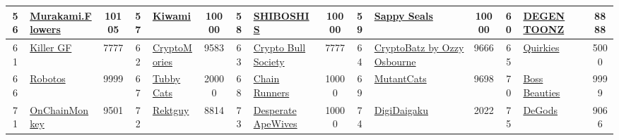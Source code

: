 \begin{table*}[]
{\begin{tabular}{|c|l|c|c|l|c|c|l|c|c|l|c|c|l|c|}
        56    & \href{https://murakamiflowers.kaikaikiki.com/}{Murakami.Flowers}                   & 10105             & 57    & \href{https://kiwami.app/}{Kiwami}                                                                & 10000             & 58    & \href{https://shiboshis.shibaswap.com/\#/}{SHIBOSHIS}                             & 10000             & 59    & \href{https://sappyseals.io}{Sappy Seals}                                     & 10000             & 60    & \href{https://degentoonz.io}{DEGEN TOONZ}                                                 & 8888                                    \\ \hline
        61    & \href{https://killergf.com/}{Killer GF}                                            & 7777              & 62    & \href{https://cryptomories.iwwon.com/home}{CryptoMories}                                          & 9583              & 63    & \href{http://cryptobullsociety.com}{Crypto Bull Society}                          & 7777              & 64    & \href{https://www.cryptobatz.com/}{CryptoBatz by Ozzy Osbourne}               & 9666              & 65    & \href{https://quirkies.io/}{Quirkies}                                                     & 5000                                    \\ \hline
        66    & \href{https://www.robotos.art}{Robotos}                                            & 9999              & 67    & \href{http://tubbycats.xyz}{Tubby Cats}                                                           & 20000             & 68    & \href{http://chainrunners.xyz}{Chain Runners}                                     & 10000             & 69    & \href{https://mutantverse.io/}{MutantCats}                                    & 9698              & 70    & \href{http://www.bossbeauties.com}{Boss Beauties}                                         & 9999                                    \\ \hline
        71    & \href{https://onchainmonkey.com/}{OnChainMonkey}                                   & 9501              & 72    & \href{https://rektguy.com}{Rektguy}                                                               & 8814              & 73    & \href{https://desperateapewives.com}{Desperate ApeWives}                          & 10000             & 74    & \href{https://digidaigaku.com/}{DigiDaigaku}                                  & 2022              & 75    & \href{https://degods.com}{DeGods}                                                         & 9066                                    \\ \hline

\end{tabular}}
\end{table*}
